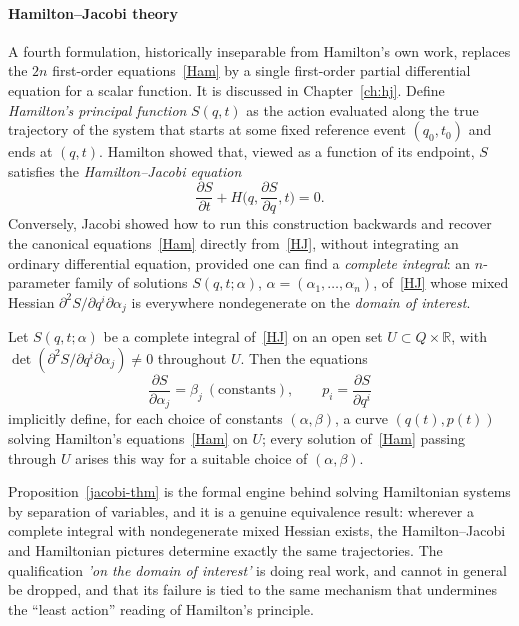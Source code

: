 \paragraph{Hamilton--Jacobi theory}
A fourth formulation, historically inseparable from Hamilton's own work,
replaces the $2n$ first-order equations~\eqref{Ham} by a single first-order
partial differential equation for a scalar function. 
It is discussed in Chapter~\ref{ch:hj}. Define \emph{Hamilton's
principal function} $S(q,t)$ as the action evaluated along the true trajectory
of the system that starts at some fixed reference event $(q_0,t_0)$ and ends at
$(q,t)$. Hamilton showed that, viewed as a function of its endpoint, $S$
satisfies the \emph{Hamilton--Jacobi equation}
\begin{equation}
\label{HJ}
\frac{\partial S}{\partial t}+H\Big(q,\frac{\partial S}{\partial q},t\Big)=0.
\end{equation}
Conversely, Jacobi showed how to run this construction backwards and recover
the canonical equations~\eqref{Ham} directly from~\eqref{HJ}, without
integrating an ordinary differential equation, provided one can find a
\emph{complete integral}: an $n$-parameter family of solutions $S(q,t;\alpha)$,
$\alpha=(\alpha_1,\dots,\alpha_n)$, of~\eqref{HJ} whose mixed Hessian
$\partial^2 S/\partial q^i\partial \alpha_j$ is everywhere nondegenerate on the
\emph{domain of interest}.

\begin{proposition}
\label{jacobi-thm}
Let $S(q,t;\alpha)$ be a complete integral of~\eqref{HJ} on an open set
    $U\subset Q\times\mathbb{R}$, with $\det(\partial^2 S/\partial
    q^i\partial\alpha_j)\neq 0$ throughout $U$. Then the equations
\begin{equation}
\frac{\partial S}{\partial\alpha_j} = \beta_j \ (\text{constants}), 
    \qquad p_i = \frac{\partial S}{\partial q^i}
\end{equation}
implicitly define, for each choice of constants $(\alpha,\beta)$, a curve
    $(q(t),p(t))$ solving Hamilton's equations~\eqref{Ham} on $U$; every
    solution of~\eqref{Ham} passing through $U$ arises this way for a suitable
    choice of $(\alpha,\beta)$.
\end{proposition}

Proposition~\ref{jacobi-thm} is the formal engine behind solving
Hamiltonian systems by separation of variables, and it is a genuine equivalence
result: wherever a complete integral with nondegenerate mixed Hessian exists,
the Hamilton--Jacobi and Hamiltonian pictures determine exactly the same
trajectories. The qualification \emph{'on the domain of interest'} is doing real
work, and  cannot in general be
dropped, and that its failure is tied to the same mechanism that undermines the
``least action'' reading of Hamilton's principle.

